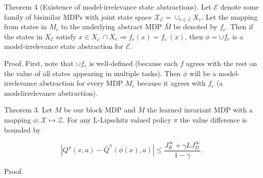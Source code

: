 \documentclass[10pt]{article}
\begin{document}
Theorem 4 (Existence of model-irrelevance state abstractions). Let $\mathcal{E}$ denote some family of bisimilar MDPs with joint state space $\mathcal{X}_{\mathcal{E}}=\cup_{e \in \mathcal{E}} X_{e}$. Let the mapping from states in $M_{e}$ to the underlying abstract MDP $\bar{M}$ be denoted by $f_{e}$. Then if the states in $X_{\mathcal{E}}$ satisfy $x \in X_{e^{\prime}} \cap X_{e} \Longrightarrow f_{e}(x)=f_{e^{\prime}}(x)$, then $\phi=\cup f_{e}$ is a model-irrelevance state abstraction for $\mathcal{E}$.

Proof. First, note that $\cup f_{e}$ is well-defined (because each $f$ agrees with the rest on the value of all states appearing in multiple tasks). Then $\phi$ will be a model-irrelevance abstraction for every MDP $M_{e}$ because it agrees with $f_{e}$ (a modelirrelevance abstraction).

Theorem 3. Let $M$ be our block MDP and $\bar{M}$ the learned invariant MDP with a mapping $\phi: \mathcal{X} \mapsto \mathcal{Z}$. For any L-Lipschitz valued policy $\pi$ the value difference is bounded by

\[
\left|Q^{\pi}(x, a)-\bar{Q}^{\pi}(\phi(x), a)\right| \leq \frac{J_{R}^{\infty}+\gamma L J_{D}^{\infty}}{1-\gamma} .
\]

Proof.
\end{document}
